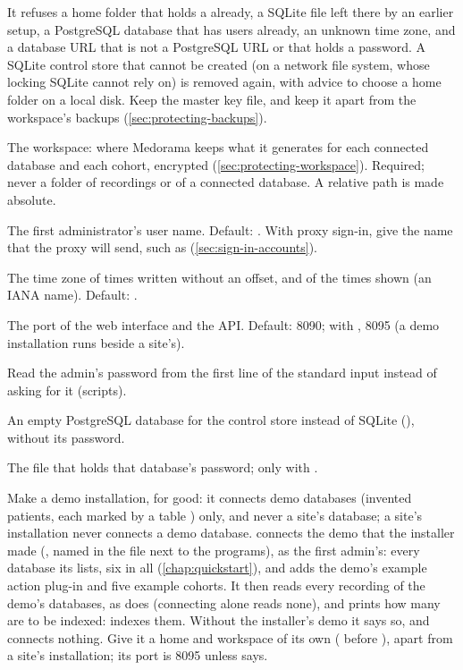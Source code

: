 It refuses a home folder that holds a  already, a SQLite file left there by
an earlier setup, a PostgreSQL database that has users already, an unknown time zone, and a
database URL that is not a PostgreSQL URL or that holds a password. A SQLite control store that
cannot be created (on a network file system, whose locking SQLite cannot rely on) is removed
again, with advice to choose a home folder on a local disk. Keep the master key file, and keep it
apart from the workspace's backups (\cref{sec:protecting-backups}).
\begin{params}
\item[--workspace DIR] The workspace: where Medorama keeps what it generates for each connected
  database and each cohort, encrypted (\cref{sec:protecting-workspace}). Required; never a folder
  of recordings or of a connected database. A relative path is made absolute.
\item[--admin NAME] The first administrator's user name. Default: . With proxy
  sign-in, give the name that the proxy will send, such as 
  (\cref{sec:sign-in-accounts}).
\item[--timezone TZ] The time zone of times written without an offset, and of the times shown
  (an IANA name). Default: .
\item[--port N] The port of the web interface and the API. Default: 8090; with , 8095 (a demo installation runs beside a site's).
\item[--password-stdin] Read the admin's password from the first line of the standard input
  instead of asking for it (scripts).
\item[--database-url URL] An empty PostgreSQL database for the control store instead of SQLite
  (), without its password.
\item[--database-password-file FILE] The file that holds that database's password; only with
  .
\item[--demo] Make a demo installation, for good: it connects demo databases (invented
  patients, each marked by a table ) only, and never a site's database; a
  site's installation never connects a demo database.  connects the demo that the
  installer made (, named in the file
   next to the programs), as the first admin's: every database its
   lists, six in all (\cref{chap:quickstart}), and adds the demo's
  example action plug-in and five example cohorts. It then reads every recording of the demo's
  databases, as  does (connecting alone reads none), and prints how
  many are to be indexed:  indexes them. Without the installer's demo it says so,
  and connects nothing. Give it a home and workspace of its own ( before
  ), apart from a site's installation; its port is 8095 unless  says.
\end{params}
